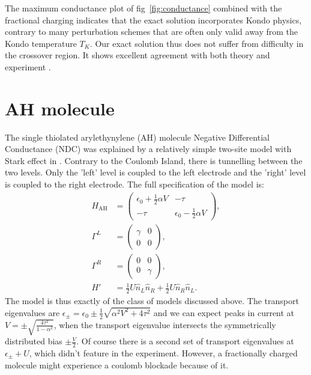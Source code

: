 \documentclass{article}
\begin{document}
\begin{multicols}{2}
        The maximum conductance plot of fig~\ref{fig:conductance} combined with the fractional charging indicates that the exact solution incorporates Kondo physics, contrary to many perturbation schemes that are often only valid away from the Kondo temperature $T_K$. Our exact solution thus does not suffer from difficulty in the crossover region. It shows excellent agreement with both theory and experiment \cite{Sasaki2000}. 
         
    \section{AH molecule}\label{sec:ahmolecule}
        
        The single thiolated arylethynylene (AH) molecule Negative Differential Conductance (NDC) was explained by a relatively simple two-site model with Stark effect in \citet{perrinnano}. Contrary to the Coulomb Island, there is tunnelling between the two levels. Only the 'left' level is coupled to the left electrode and the 'right' level is coupled to the right electrode. The full specification of the model is:
        \begin{align*}
            H_\text{AH} &= \begin{pmatrix} \epsilon_0 + \frac{1}{2}\alpha V & -\tau \\-\tau &  \epsilon_0 - \frac{1}{2} \alpha V\end{pmatrix}, \\
            \Gamma^L &= \begin{pmatrix} \gamma & 0 \\ 0 & 0 \end{pmatrix} ,\\
            \Gamma^R &= \begin{pmatrix} 0 & 0 \\ 0 & \gamma \end{pmatrix} ,\\
            H' &= \frac{1}{2} U \hat{n}_L \hat{n}_R + \frac{1}{2} U \hat{n}_R \hat{n}_L.
        \end{align*}
        The model is thus exactly of the class of models discussed above. The transport eigenvalues are $\epsilon_\pm = \epsilon_0 \pm \frac{1}{2} \sqrt{\alpha^2 V^2 + 4\tau^2}$ and we can expect peaks in current at $V = \pm \sqrt{ \frac{4\tau^2}{1-\alpha^2}}$, when the transport eigenvalue intersects the symmetrically distributed bias $\pm \frac{V}{2}$. Of course there is a second set of transport eigenvalues at $\epsilon_\pm + U$, which didn't feature in the experiment. However, a fractionally charged molecule might experience a coulomb blockade because of it.
        

\end{multicols}
\end{document}
